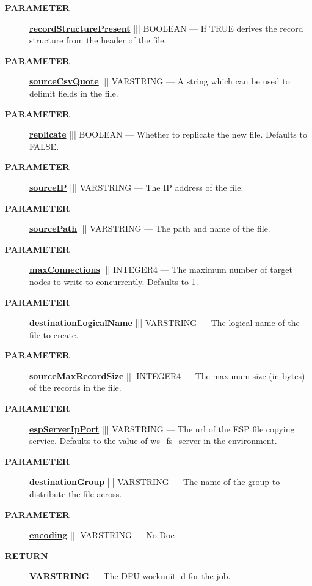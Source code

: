 \begin{description}
\item [\colorbox{tagtype}{\color{white} \textbf{\textsf{PARAMETER}}}] \textbf{\underline{recordStructurePresent}} ||| BOOLEAN --- If TRUE derives the record structure from the header of the file.
\item [\colorbox{tagtype}{\color{white} \textbf{\textsf{PARAMETER}}}] \textbf{\underline{sourceCsvQuote}} ||| VARSTRING --- A string which can be used to delimit fields in the file.
\item [\colorbox{tagtype}{\color{white} \textbf{\textsf{PARAMETER}}}] \textbf{\underline{replicate}} ||| BOOLEAN --- Whether to replicate the new file. Defaults to FALSE.
\item [\colorbox{tagtype}{\color{white} \textbf{\textsf{PARAMETER}}}] \textbf{\underline{sourceIP}} ||| VARSTRING --- The IP address of the file.
\item [\colorbox{tagtype}{\color{white} \textbf{\textsf{PARAMETER}}}] \textbf{\underline{sourcePath}} ||| VARSTRING --- The path and name of the file.
\item [\colorbox{tagtype}{\color{white} \textbf{\textsf{PARAMETER}}}] \textbf{\underline{maxConnections}} ||| INTEGER4 --- The maximum number of target nodes to write to concurrently. Defaults to 1.
\item [\colorbox{tagtype}{\color{white} \textbf{\textsf{PARAMETER}}}] \textbf{\underline{destinationLogicalName}} ||| VARSTRING --- The logical name of the file to create.
\item [\colorbox{tagtype}{\color{white} \textbf{\textsf{PARAMETER}}}] \textbf{\underline{sourceMaxRecordSize}} ||| INTEGER4 --- The maximum size (in bytes) of the records in the file.
\item [\colorbox{tagtype}{\color{white} \textbf{\textsf{PARAMETER}}}] \textbf{\underline{espServerIpPort}} ||| VARSTRING --- The url of the ESP file copying service. Defaults to the value of ws\_fs\_server in the environment.
\item [\colorbox{tagtype}{\color{white} \textbf{\textsf{PARAMETER}}}] \textbf{\underline{destinationGroup}} ||| VARSTRING --- The name of the group to distribute the file across.
\item [\colorbox{tagtype}{\color{white} \textbf{\textsf{PARAMETER}}}] \textbf{\underline{encoding}} ||| VARSTRING --- No Doc
\end{description}







\par
\begin{description}
\item [\colorbox{tagtype}{\color{white} \textbf{\textsf{RETURN}}}] \textbf{VARSTRING} --- The DFU workunit id for the job.
\end{description}




